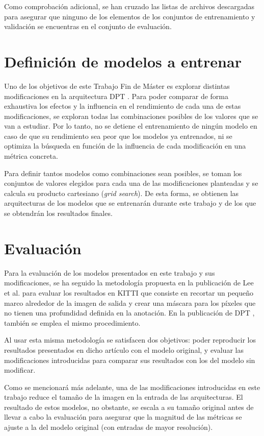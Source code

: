 Como comprobación adicional, se han cruzado las listas de archivos descargadas para asegurar que ninguno de los elementos de los conjuntos de entrenamiento y validación se encuentras en el conjunto de evaluación.


\section{Definición de modelos a entrenar}\label{modelos-a-entrenar}
Uno de los objetivos de este Trabajo Fin de Máster es explorar distintas modificaciones en la arquitectura DPT \cite{visiontransformersDPT}. Para poder comparar de forma exhaustiva los efectos y la influencia en el rendimiento de cada una de estas modificaciones, se exploran todas las combinaciones posibles de los valores que se van a estudiar. Por lo tanto, no se detiene el entrenamiento de ningún modelo en caso de que su rendimiento sea peor que los modelos ya entrenados, ni se optimiza la búsqueda en función de la influencia de cada modificación en una métrica concreta.

Para definir tantos modelos como combinaciones sean posibles, se toman los conjuntos de valores elegidos para cada una de las modificaciones planteadas y se calcula su producto cartesiano (\textit{grid search}). De esta forma, se obtienen las arquitecturas de los modelos que se entrenarán durante este trabajo y de los que se obtendrán los resultados finales.


\section{Evaluación}
Para la evaluación de los modelos presentados en este trabajo y sus modificaciones, se ha seguido la metodología propuesta en la publicación de Lee et al. \cite{bts} para evaluar los resultados en KITTI que consiste en recortar un pequeño marco alrededor de la imagen de salida y crear una máscara para los píxeles que no tienen una profundidad definida en la anotación. En la publicación de DPT \cite{visiontransformersDPT}, también se emplea el mismo procedimiento.

Al usar esta misma metodología se satisfacen dos objetivos: poder reproducir los resultados presentados en dicho artículo con el modelo original, y evaluar las modificaciones introducidas para comparar sus resultados con los del modelo sin modificar. 

Como se mencionará más adelante, una de las modificaciones introducidas en este trabajo reduce el tamaño de la imagen en la entrada de las arquitecturas. El resultado de estos modelos, no obstante, se escala a su tamaño original antes de llevar a cabo la evaluación para asegurar que la magnitud de las métricas se ajuste a la del modelo original (con entradas de mayor resolución).

